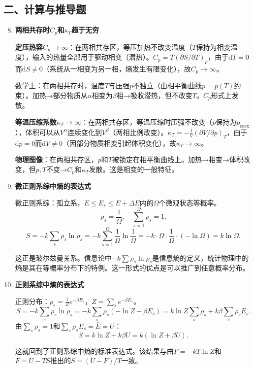 \documentclass[12pt,a4paper,fontset=mac]{ctexart}
\newcommand{\dd}{\mathrm{d}}
\newcommand{\đ}{\mathrm{đ}}
\begin{document}
\subsection*{二、计算与推导题}

\begin{enumerate}
\setcounter{enumi}{7}

\item \textbf{两相共存时$C_p$和$\kappa_T$趋于无穷}

\textbf{定压热容$C_p\to\infty$}：在两相共存区，等压加热不改变温度（$T$保持为相变温度），输入的热量全部用于驱动相变（潜热）。$C_p=T(\partial S/\partial T)_p$，由于$\dd T=0$而$\dd S\neq0$（系统从一相变为另一相，熵发生有限变化），故$C_p\to\infty$。

数学上：在两相共存时，温度$T$与压强$p$不独立（由相平衡曲线$p=p(T)$约束）。加热→部分物质从$\alpha$相变为$\beta$相→吸收潜热，但不改变$T$。$C_p$形式上发散。

\textbf{等温压缩系数$\kappa_T\to\infty$}：在两相共存区，等温压缩时压强不改变（$p$保持为$p_{\text{coex}}$），体积可以从$V^\alpha$连续变化到$V^\beta$（两相比例改变）。$\kappa_T=-\frac{1}{V}(\partial V/\partial p)_T$，由于$\dd p=0$而$\dd V\neq0$（因部分物质相变引起体积变化），故$\kappa_T\to\infty$。

\textbf{物理图像}：在两相共存区，$p$和$T$被锁定在相平衡曲线上。加热→相变→体积改变，但$p,T$不变→$C_p$和$\kappa_T$发散。这是相变的一般特征。

\item \textbf{微正则系综中熵的表达式}

微正则系综：孤立系，$E\le E_s\le E+\Delta E$内的$\Omega$个微观状态等概率。
\[\rho_s=\frac{1}{\Omega},\quad\sum_{s=1}^{\Omega}\rho_s=1.\]
\[S=-k\sum_s\rho_s\ln\rho_s=-k\sum_{s=1}^{\Omega}\frac{1}{\Omega}\ln\frac{1}{\Omega}=-k\cdot\Omega\cdot\frac{1}{\Omega}\cdot(-\ln\Omega)=k\ln\Omega.\]

这正是玻尔兹曼关系。信息论中$-k\sum\rho_s\ln\rho_s$是信息熵的定义，统计物理中的熵是其在等概率分布下的特例。这一形式的优点是可以推广到任意概率分布。

\item \textbf{正则系综中熵的表达式}

正则分布：$\rho_s=\frac{1}{Z}e^{-\beta E_s}$，$Z=\sum_se^{-\beta E_s}$。
\[S=-k\sum_s\rho_s\ln\rho_s=-k\sum_s\rho_s(-\ln Z-\beta E_s)=k\ln Z\sum_s\rho_s+k\beta\sum_s\rho_sE_s.\]
由$\sum_s\rho_s=1$和$\sum_s\rho_s E_s=\bar{E}=U$：
\[S=k\ln Z+k\beta U=k(\ln Z+\beta U).\]

这就回到了正则系综中熵的标准表达式。该结果与由$F=-kT\ln Z$和$F=U-TS$推出的$S=(U-F)/T$一致。


\end{enumerate}
\end{document}
